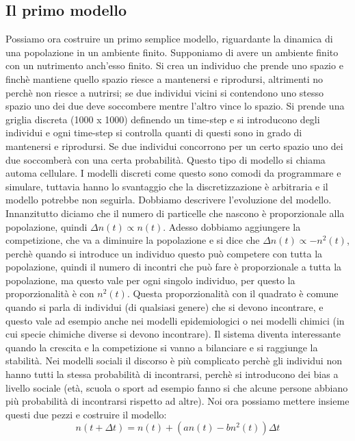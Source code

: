 \documentclass[12pt]{article}
\begin{document}
\subsection{Il primo modello}
Possiamo ora costruire un primo semplice modello, riguardante la dinamica di una popolazione in un ambiente finito. Supponiamo di avere un ambiente finito con un nutrimento anch'esso finito. Si crea un individuo che prende uno spazio e finchè mantiene quello spazio riesce a mantenersi e riprodursi, altrimenti no perchè non riesce a nutrirsi; se due individui vicini si contendono uno stesso spazio uno dei due deve soccombere mentre l'altro vince lo spazio. 
Si prende una griglia discreta (1000 x 1000) definendo un time-step e si introducono degli individui e ogni time-step si controlla quanti di questi sono in grado di mantenersi e riprodursi. Se due individui concorrono per un certo spazio uno dei due soccomberà con una certa probabilità. Questo tipo di modello si chiama automa cellulare. I modelli discreti come questo sono comodi da programmare e simulare, tuttavia hanno lo svantaggio che la discretizzazione è arbitraria e il modello potrebbe non seguirla. Dobbiamo descrivere l'evoluzione del modello. Innanzitutto diciamo che il numero di particelle che nascono è proporzionale alla popolazione, quindi $\Delta n(t) \propto n(t)$. Adesso dobbiamo aggiungere la competizione, che va a diminuire la popolazione e si dice che $\Delta n(t) \propto -n^2(t)$, perchè quando si introduce un individuo questo può competere con tutta la popolazione, quindi il numero di incontri che può fare è proporzionale a tutta la popolazione, ma questo vale per ogni singolo individuo, per questo la proporzionalità è con $n^2(t)$. Questa proporzionalità con il quadrato è comune quando si parla di individui (di qualsiasi genere) che si devono incontrare, e questo vale ad esempio anche nei modelli epidemiologici o nei modelli chimici (in cui specie chimiche diverse si devono incontrare). Il sistema diventa interessante quando la crescita e la competizione si vanno a bilanciare e si raggiunge la stabilità. Nei modelli sociali il discorso è più complicato perchè gli individui non hanno tutti la stessa probabilità di incontrarsi, perchè si introducono dei bias a livello sociale (età, scuola o sport ad esempio fanno si che alcune persone abbiano più probabilità di incontrarsi rispetto ad altre). Noi ora possiamo mettere insieme questi due pezzi e costruire il modello: 
\begin{equation}
	n(t + \Delta t) = n(t) + (an(t) - bn^2(t))\Delta t
\end{equation}
\end{document}

